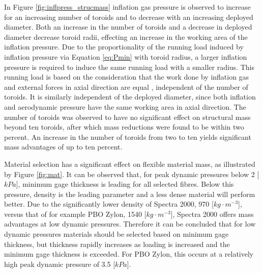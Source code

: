 In Figure \ref{fig:inflpress_strucmass} inflation gas pressure is observed to increase for an increasing number of toroids and to decrease with an increasing deployed diameter. Both an increase in the number of toroids and a decrease in deployed diameter decrease toroid radii, effecting an increase in the working area of the inflation pressure. Due to the proportionality of the running load induced by inflation pressure via Equation \ref{eq:Pmin} with toroid radius, a larger inflation pressure is required to induce the same running load with a smaller radius. This running load is based on the consideration that the work done by inflation gas and external forces in axial direction are equal \cite{Brown2009}, independent of the number of toroids. It is similarly independent of the deployed diameter, since both inflation and aerodynamic pressure have the same working area in axial direction.
The number of toroids was observed to have no significant effect on structural mass beyond ten toroids, after which mass reductions were found to be within two percent. An increase in the number of toroids from two to ten yields significant mass advantages of up to ten percent. 



Material selection has a significant effect on flexible material mass, as illustrated by Figure \ref{fig:mat}. It can be observed that, for peak dynamic pressures below 2 [$kPa$], minimum gage thickness is leading for all selected fibres. Below this pressure, density is the leading parameter and a less dense material will perform better. Due to the significantly lower density of Spectra 2000, 970 [$kg \cdot m^{-3}$], versus that of for example PBO Zylon, 1540 [$kg \cdot m^{-3}$], Spectra 2000 offers mass advantages at low dynamic pressures. Therefore it can be concluded that for low dynamic pressures materials should be selected based on minimum gage thickness, but thickness rapidly increases as loading is increased and the minimum gage thickness is exceeded. For PBO Zylon, this occurs at a relatively high peak dynamic pressure of 3.5 [$kPa$].

